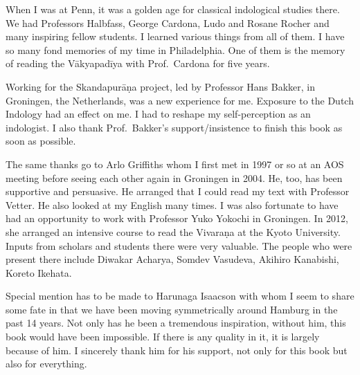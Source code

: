 When I was at Penn, it was a golden age for classical indological studies there. We had Professors Halbfass, George Cardona, Ludo and Rosane Rocher and many inspiring fellow students. I learned various things from all of them. I have so many fond memories of my time in Philadelphia. One of them is the memory of reading the Vākyapadīya with Prof.\ Cardona for five years.

Working for the Skandapurāṇa project, led by Professor Hans Bakker, in Groningen, the Netherlands, was a new experience for me. Exposure to the Dutch Indology had an effect on me. I had to reshape my self-perception as an indologist. I also thank Prof.\ Bakker's support/insistence to finish this book as soon as possible. %

The same thanks go to Arlo Griffiths whom I first met in 1997 or so at an AOS meeting before seeing each other again in Groningen in 2004. He, too, has been supportive and persuasive. He arranged that I could read my text with Professor Vetter. He also looked at my English many times. I was also fortunate to have had an opportunity to work with Professor Yuko Yokochi in Groningen. In 2012, she arranged an intensive course to read the Vivaraṇa at the Kyoto University. Inputs from scholars and students there were very valuable. The people who were present there include Diwakar Acharya, Somdev Vasudeva, Akihiro Kanabishi, Koreto Ikehata. 

Special mention has to be made to Harunaga Isaacson with whom I seem to share some fate in that we have been moving symmetrically around Hamburg in the past 14 years. Not only has he been a tremendous inspiration, without him, this book would have been impossible. If there is any quality in it, it is largely because of him. I sincerely thank him for his support, not only for this book but also for everything. 

